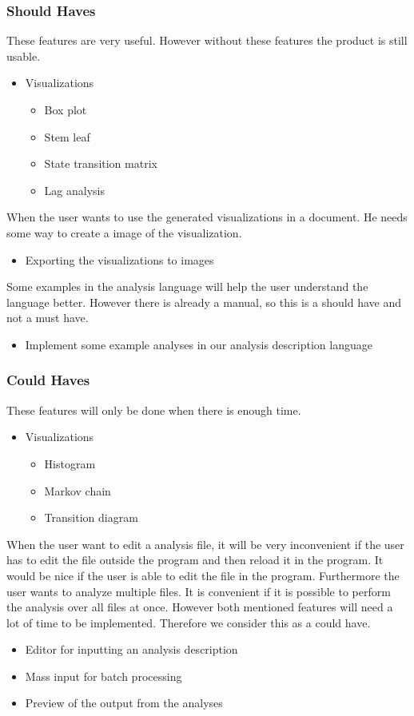 \subsubsection{Should Haves}
These features are very useful. However without these features the product is still usable.
\begin{itemize}
	\item Visualizations
    \begin{itemize}
    	\item Box plot
        \item Stem leaf
        \item State transition matrix
        \item Lag analysis
    \end{itemize}
 \end{itemize}
   When the user wants to use the generated visualizations in a document. He needs some way to create a image of the visualization.
 \begin{itemize}
	\item Exporting the visualizations to images
\end{itemize}
Some examples in the analysis language will help the user understand the language better. However there is already a manual, so this is a should have and not a must have.
\begin{itemize}
    \item Implement some example analyses in our analysis description language
\end{itemize}

\subsubsection{Could Haves}
These features will only be done when there is enough time.
 \begin{itemize}
  \item Visualizations
  \begin{itemize}
	  \item Histogram
      \item Markov chain
      \item Transition diagram
  \end{itemize}
\end{itemize}
When the user want to edit a analysis file, it will be very inconvenient if the user has to edit the file outside the program and then reload it in the program. It would be nice if the user is able to edit the file in the program. Furthermore the user wants to analyze multiple files. It is convenient if it is possible to perform the analysis over all files at once. However both mentioned features will need a lot of time to be implemented. Therefore we consider this as a could have.
\begin{itemize}
  \item Editor for inputting an analysis description 
  \item Mass input for batch processing 
  \item Preview of the output from the analyses
\end{itemize}


